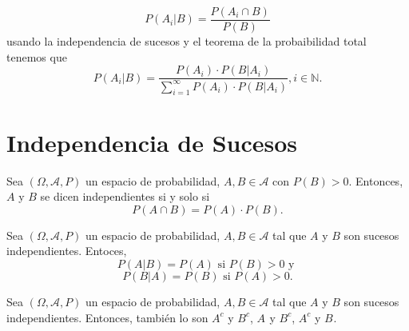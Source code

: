 \begin{dem}
  \[ 
    P(A_{i} | B ) = \frac{P(A_{i} \cap B)}{P(B)} 
  \] 
  usando la independencia de sucesos y el teorema de la probaibilidad total tenemos que
  \[ 
    P(A_{i} | B)= \frac{P(A_{i}) \cdot P(B | A_{i})}{\sum_{i = 1}^{\infty} P(A_{i}) \cdot P(B | A_{i})}, i \in \mathbb{N}.
  \] 
\end{dem}

\section{Independencia de Sucesos}

\begin{defn}
  Sea $(\Omega, \mathcal{A}, P )$ un espacio de probabilidad, $A, B \in \mathcal{A}$ con $P(B) > 0$. Entonces, $A$ y $B$ se dicen independientes si y solo si 
  \[ 
    P( A \cap B) = P(A) \cdot P(B) .
  \] 
\end{defn}

\begin{prop}
  Sea $(\Omega, \mathcal{A}, P )$ un espacio de probabilidad, $A, B \in \mathcal{A}$ tal que $A$ y $B$ son sucesos independientes. Entoces, 
  \[ 
    P(A | B) = P(A) \text{ si } P(B) > 0 \text{ y } 
  \] 
  \[ 
    P(B | A) = P(B) \text{ si } P(A) > 0.
  \] 
\end{prop}

\begin{prop}
  Sea $(\Omega, \mathcal{A}, P )$ un espacio de probabilidad, $A, B \in \mathcal{A}$ tal que $A$ y $B$ son sucesos independientes. Entonces, también lo son $A^{c}$ y $B^{c}$, $A^{}$ y $B^{c}$, $A^{c}$ y $B^{}$.
\end{prop}
